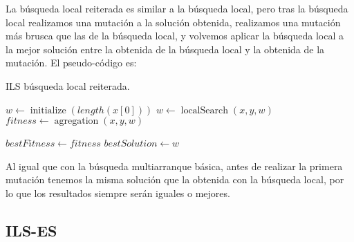 \documentclass[11pt,a4paper]{article}
\begin{document}
La búsqueda local reiterada es similar a la búsqueda local, pero tras la búsqueda local realizamos una mutación a la solución obtenida, realizamos una mutación más brusca que las de la búsqueda local, y volvemos aplicar la búsqueda local a la mejor solución entre la obtenida de la búsqueda local y la obtenida de la mutación. El pseudo-código es: \\ 
\begin{algorithm}[H]
	\caption{{\sc ILS} búsqueda local reiterada.}
	
	$w \gets \operatorname{initialize}(length(x[0]))$ \;
	$w \gets \operatorname{localSearch}(x, y, w)$ \;
	$fitness \gets \operatorname{agregation}(x, y, w)$ \;
	
	$bestFitness \gets fitness$ \;
	$bestSolution \gets w$ \;
	
	 \;
\end{algorithm}

Al igual que con la búsqueda multiarranque básica, antes de realizar la primera mutación tenemos la misma solución que la obtenida con la búsqueda local, por lo que los resultados siempre serán iguales o mejores.

\subsection{ILS-ES}
\end{document}
